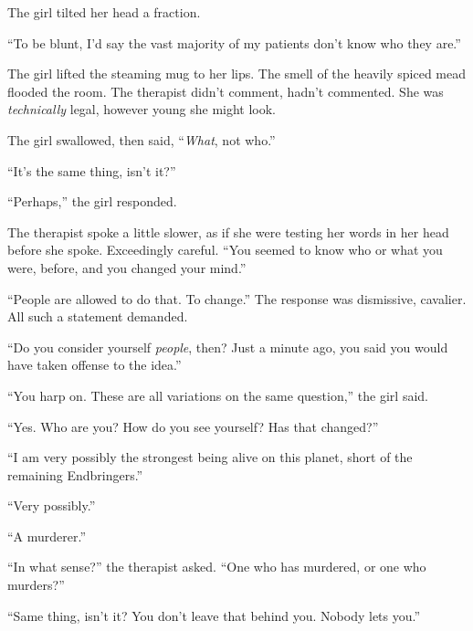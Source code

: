 The girl tilted her head a fraction.



``To be blunt, I'd say the vast majority of my patients don't know who they are.''



The girl lifted the steaming mug to her lips.  The smell of the heavily spiced mead flooded the room. The therapist didn't comment, hadn't commented.  She was \emph{technically} legal, however young she might look.



The girl swallowed, then said, ``\emph{What}, not who.''



``It's the same thing, isn't it?''



``Perhaps,'' the girl responded.



The therapist spoke a little slower, as if she were testing her words in her head before she spoke.  Exceedingly careful.  ``You seemed to know who or what you were, before, and you changed your mind.''



``People are allowed to do that.  To change.''  The response was dismissive, cavalier.  All such a statement demanded.



``Do you consider yourself \emph{people}, then?  Just a minute ago, you said you would have taken offense to the idea.''



``You harp on.  These are all variations on the same question,'' the girl said.



``Yes.  Who are you?  How do you see yourself?  Has that changed?''



``I am very possibly the strongest being alive on this planet, short of the remaining Endbringers.''



``Very possibly.''



``A murderer.''



``In what sense?'' the therapist asked.  ``One who has murdered, or one who murders?''



``Same thing, isn't it?  You don't leave that behind you.  Nobody lets you.''



